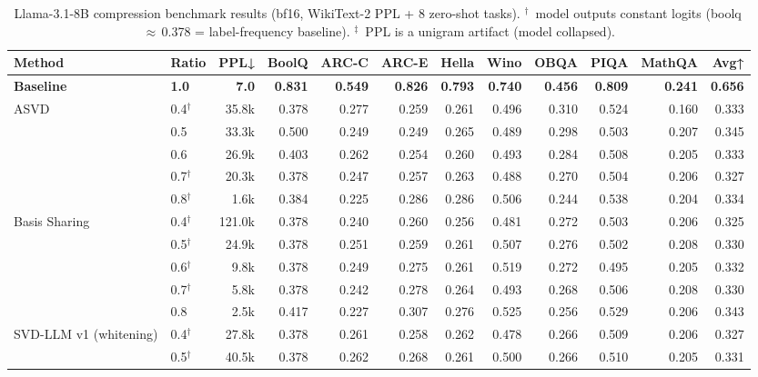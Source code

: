 \begin{table}[t]
\centering\small
\caption{Llama-3.1-8B compression benchmark results (bf16, WikiText-2 PPL + 8 zero-shot tasks). $^\dagger$~model outputs constant logits (boolq\,$\approx$\,0.378 = label-frequency baseline). $^\ddagger$~PPL is a unigram artifact (model collapsed).}
\label{tab:llama31_8b}
\begin{tabular}{llrrrrrrrrrr}
\toprule
Method & Ratio & PPL↓ & BoolQ & ARC-C & ARC-E & Hella & Wino & OBQA & PIQA & MathQA & Avg↑ \\
\midrule
\textbf{Baseline} & \textbf{1.0} & \textbf{7.0} & \textbf{0.831} & \textbf{0.549} & \textbf{0.826} & \textbf{0.793} & \textbf{0.740} & \textbf{0.456} & \textbf{0.809} & \textbf{0.241} & \textbf{0.656} \\
\midrule
\multirow{5}{*}{ASVD} & 0.4$^{\dagger}$ & 35.8k & 0.378 & 0.277 & 0.259 & 0.261 & 0.496 & 0.310 & 0.524 & 0.160 & 0.333 \\
 & 0.5 & 33.3k & 0.500 & 0.249 & 0.249 & 0.265 & 0.489 & 0.298 & 0.503 & 0.207 & 0.345 \\
 & 0.6 & 26.9k & 0.403 & 0.262 & 0.254 & 0.260 & 0.493 & 0.284 & 0.508 & 0.205 & 0.333 \\
 & 0.7$^{\dagger}$ & 20.3k & 0.378 & 0.247 & 0.257 & 0.263 & 0.488 & 0.270 & 0.504 & 0.206 & 0.327 \\
 & 0.8$^{\dagger}$ & 1.6k & 0.384 & 0.225 & 0.286 & 0.286 & 0.506 & 0.244 & 0.538 & 0.204 & 0.334 \\
\cmidrule{1-12}
\multirow{5}{*}{Basis Sharing} & 0.4$^{\dagger}$ & 121.0k & 0.378 & 0.240 & 0.260 & 0.256 & 0.481 & 0.272 & 0.503 & 0.206 & 0.325 \\
 & 0.5$^{\dagger}$ & 24.9k & 0.378 & 0.251 & 0.259 & 0.261 & 0.507 & 0.276 & 0.502 & 0.208 & 0.330 \\
 & 0.6$^{\dagger}$ & 9.8k & 0.378 & 0.249 & 0.275 & 0.261 & 0.519 & 0.272 & 0.495 & 0.205 & 0.332 \\
 & 0.7$^{\dagger}$ & 5.8k & 0.378 & 0.242 & 0.278 & 0.264 & 0.493 & 0.268 & 0.506 & 0.208 & 0.330 \\
 & 0.8 & 2.5k & 0.417 & 0.227 & 0.307 & 0.276 & 0.525 & 0.256 & 0.529 & 0.206 & 0.343 \\
\cmidrule{1-12}
\multirow{5}{*}{SVD-LLM v1 (whitening)} & 0.4$^{\dagger}$ & 27.8k & 0.378 & 0.261 & 0.258 & 0.262 & 0.478 & 0.266 & 0.509 & 0.206 & 0.327 \\
 & 0.5$^{\dagger}$ & 40.5k & 0.378 & 0.262 & 0.268 & 0.261 & 0.500 & 0.266 & 0.510 & 0.205 & 0.331 \\

\end{tabular}
\end{table}

